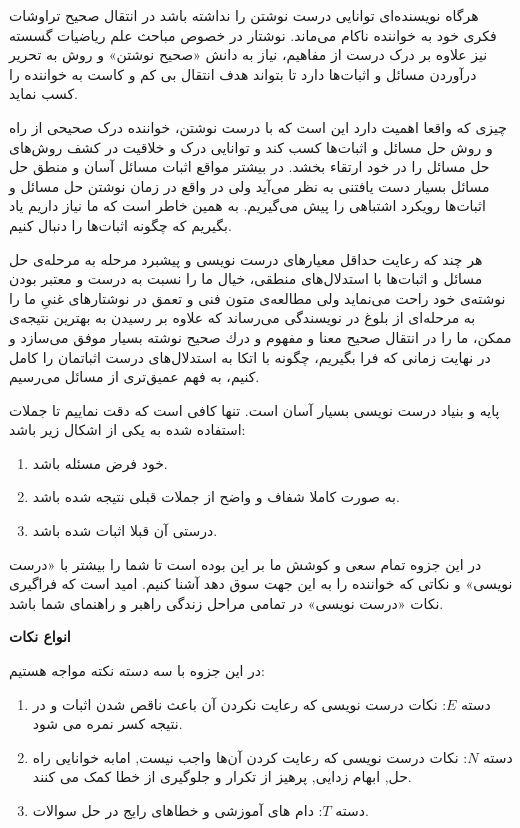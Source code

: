 \documentclass[11pt,largemargins]{h2wp}
\begin{document}
\maketitle

هرگاه نویسنده‌ای توانایی درست نوشتن را نداشته باشد در انتقال صحیح تراوشات فکری خود به خواننده ناکام می‌ماند. نوشتار در خصوص مباحث علم ریاضیات گسسته نیز علاوه بر درک درست از مفاهیم، نیاز به دانش «صحیح نوشتن» و روش به تحریر درآوردن مسائل و اثبات‌ها دارد تا بتواند هدف انتقال بی‌ کم و کاست به خواننده را کسب نماید.

چیزی که واقعا اهمیت دارد این است که با درست نوشتن، خواننده درک صحیحی از راه و روش حل مسائل و اثبات‌ها كسب كند و توانایی درک و خلاقیت در کشف روش‌های حل مسائل را در خود ارتقاء بخشد.
در بیشتر مواقع اثبات مسائل آسان و منطق حل مسائل بسیار دست یافتنی به نظر می‌آید ولی در واقع در زمان نوشتن حل مسائل و اثبات‌ها رویکرد اشتباهی را پیش می‌گیریم.
به همین خاطر است که ما نیاز داریم یاد بگیریم كه چگونه اثبات‌ها را دنبال کنیم.

هر چند كه رعایت حداقل معیارهای درست نویسی و پیشبرد مرحله به مرحله‌ی حل مسائل و اثبات‌ها با استدلال‌های منطقی، خیال ما را نسبت به درست و معتبر بودن نوشته‌ی خود راحت می‌نماید ولی مطالعه‌ی متون فنی و تعمق در نوشتارهای غنیِ ما را به مرحله‌ای از بلوغ در نویسندگی می‌رساند كه علاوه بر رسیدن به بهترین نتیجه‌ی ممكن، ما را در انتقال صحیح معنا و مفهوم و درك صحیح نوشته بسیار موفق می‌سازد
و در نهایت زمانی که فرا بگیریم، چگونه با اتكا به استدلال‌های درست اثباتمان را کامل کنیم، به فهم عمیق‌تری از مسائل می‌رسیم.

پایه و بنیاد درست نویسی بسیار آسان است. تنها کافی است که دقت نماییم تا جملات استفاده شده به یکی از اشکال زیر باشد:

\begin{enumerate}
\item
خود فرض مسئله باشد.
\item
به صورت كاملا شفاف و واضح از جملات قبلی نتیجه شده باشد.
\item
درستی آن قبلا اثبات شده باشد.
\end{enumerate}

در این جزوه تمام سعی و کوشش ما بر این بوده است تا شما را بیشتر با «درست نویسی» و نکاتی که خواننده را به این جهت سوق دهد آشنا کنیم.
امید است كه فراگیری نكات «درست نویسی» در تمامی مراحل زندگی راهبر و راهنمای شما باشد.


\textbf{انواع نکات}

در این جزوه با سه دسته نکته مواجه هستیم:
\begin{enumerate}

\item
دسته $E$: نکات درست نویسی که رعایت نکردن آن باعث ناقص شدن اثبات و در نتیجه کسر نمره می شود.
\item
دسته $N$: نکات درست نویسی که رعایت کردن آن‌ها واجب نیست, امابه خوانایی راه حل, ابهام زدایی, پرهیز از تکرار و جلوگیری از خطا کمک می کنند.
\item
دسته $T$: دام های آموزشی و خطاهای رایج در حل سوالات.

\end{enumerate}
\end{document}
